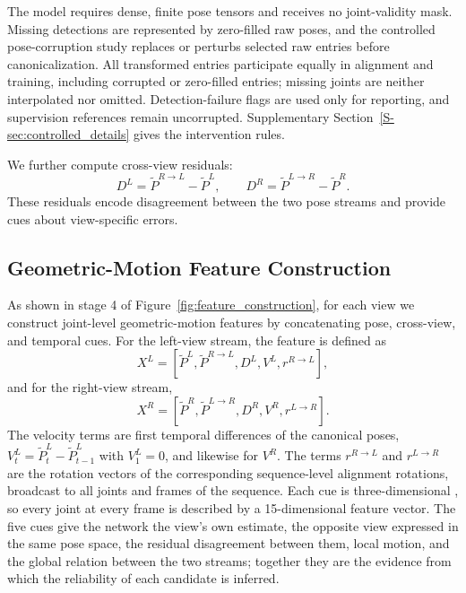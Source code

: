 \documentclass[preprint,12pt]{elsarticle}
\providecommand{\DIFaddbegin}{} %
\providecommand{\DIFaddend}{} %
\providecommand{\DIFadd}[1]{{\protect\color{blue}#1}} %
\begin{document}
The model requires dense, finite pose tensors and receives no joint-validity mask. Missing detections are represented by zero-filled raw poses, and the controlled pose-corruption study replaces or perturbs selected raw entries before canonicalization. All transformed entries participate equally in alignment and training, including corrupted or zero-filled entries; missing joints are neither interpolated nor omitted. Detection-failure flags are used only for reporting, and supervision references remain uncorrupted. Supplementary Section~\ref{S-sec:controlled_details} gives the intervention rules.

We further compute cross-view residuals:
\[
D^{L} = \tilde{P}^{R \rightarrow L} - \tilde{P}^{L},
\qquad
D^{R} = \tilde{P}^{L \rightarrow R} - \tilde{P}^{R}.
\]
These residuals encode disagreement between the two pose streams and provide cues about view-specific errors.

\subsection{Geometric-Motion Feature Construction}
\label{subsec:feature_construction}

 As shown in \DIFaddbegin \DIFadd{stage 4 of }\DIFaddend Figure~\ref{fig:feature_construction}, for each view  we construct joint-level geometric-motion features by concatenating pose, cross-view, and temporal cues. For the left-view stream, the feature is defined as
\[
X^{L}
=
\left[
\tilde{P}^{L},
\tilde{P}^{R \rightarrow L},
D^{L},
V^{L},
r^{R \rightarrow L}
\right],
\]
and for the right-view stream,
\[
X^{R}
=
\left[
\tilde{P}^{R},
\tilde{P}^{L \rightarrow R},
D^{R},
V^{R},
r^{L \rightarrow R}
\right].
\]
 The velocity terms  \DIFaddbegin \DIFadd{are first temporal differences of the canonical poses, \(V^{L}_{t}=\tilde{P}^{L}_{t}-\tilde{P}^{L}_{t-1}\) with \(V^{L}_{1}=0\), and likewise for \(V^{R}\). The terms \(r^{R \rightarrow L}\) }\DIFaddend and  \DIFaddbegin \DIFadd{\(r^{L \rightarrow R}\) are the rotation vectors of the corresponding sequence-level alignment rotations, broadcast to all joints and frames of the sequence. Each cue is }\DIFaddend three-dimensional \DIFaddbegin \DIFadd{, so every joint at every frame is described by }\DIFaddend a 15-dimensional feature  \DIFaddbegin \DIFadd{vector. The five cues give the network the view's own estimate, the opposite view expressed in the same pose space, the residual disagreement between them, local motion, and the global relation between the two streams; together they are the evidence from which the reliability of each candidate is inferred}\DIFaddend .
\end{document}
